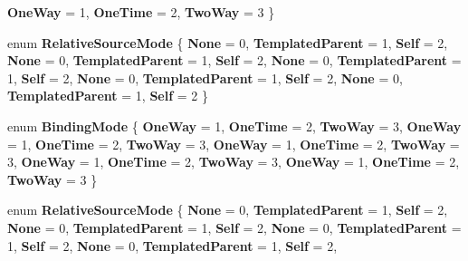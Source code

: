 \begin{DoxyCompactItemize}
{\bfseries One\+Way} = 1, 
{\bfseries One\+Time} = 2, 
{\bfseries Two\+Way} = 3
 \}
\item 
\mbox{\label{namespace_windows_1_1_u_i_1_1_xaml_1_1_data_a5e4ee6dff370c4af738541df52d97b7f}} 
enum {\bfseries Relative\+Source\+Mode} \{ \newline
{\bfseries None} = 0, 
{\bfseries Templated\+Parent} = 1, 
{\bfseries Self} = 2, 
{\bfseries None} = 0, 
\newline
{\bfseries Templated\+Parent} = 1, 
{\bfseries Self} = 2, 
{\bfseries None} = 0, 
{\bfseries Templated\+Parent} = 1, 
\newline
{\bfseries Self} = 2, 
{\bfseries None} = 0, 
{\bfseries Templated\+Parent} = 1, 
{\bfseries Self} = 2, 
\newline
{\bfseries None} = 0, 
{\bfseries Templated\+Parent} = 1, 
{\bfseries Self} = 2
 \}
\item 
\mbox{\label{namespace_windows_1_1_u_i_1_1_xaml_1_1_data_ae354a03d8fd12bbb128f8758633b2bd8}} 
enum {\bfseries Binding\+Mode} \{ \newline
{\bfseries One\+Way} = 1, 
{\bfseries One\+Time} = 2, 
{\bfseries Two\+Way} = 3, 
{\bfseries One\+Way} = 1, 
\newline
{\bfseries One\+Time} = 2, 
{\bfseries Two\+Way} = 3, 
{\bfseries One\+Way} = 1, 
{\bfseries One\+Time} = 2, 
\newline
{\bfseries Two\+Way} = 3, 
{\bfseries One\+Way} = 1, 
{\bfseries One\+Time} = 2, 
{\bfseries Two\+Way} = 3, 
\newline
{\bfseries One\+Way} = 1, 
{\bfseries One\+Time} = 2, 
{\bfseries Two\+Way} = 3
 \}
\item 
\mbox{\label{namespace_windows_1_1_u_i_1_1_xaml_1_1_data_a5e4ee6dff370c4af738541df52d97b7f}} 
enum {\bfseries Relative\+Source\+Mode} \{ \newline
{\bfseries None} = 0, 
{\bfseries Templated\+Parent} = 1, 
{\bfseries Self} = 2, 
{\bfseries None} = 0, 
\newline
{\bfseries Templated\+Parent} = 1, 
{\bfseries Self} = 2, 
{\bfseries None} = 0, 
{\bfseries Templated\+Parent} = 1, 
\newline
{\bfseries Self} = 2, 
{\bfseries None} = 0, 
{\bfseries Templated\+Parent} = 1, 
{\bfseries Self} = 2, 
\newline

\end{DoxyCompactItemize}
